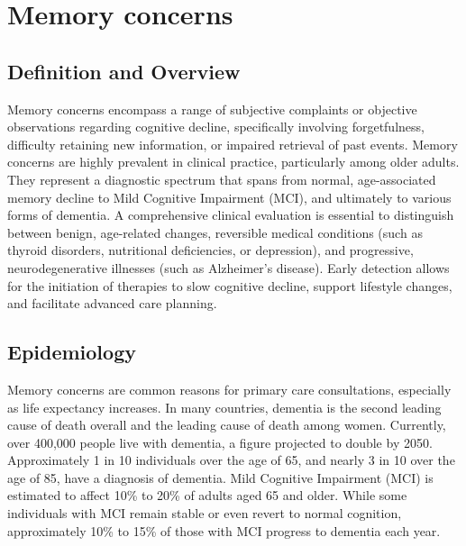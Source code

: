 \chapter{Memory concerns}

\section*{Definition and Overview}
Memory concerns encompass a range of subjective complaints or objective observations regarding cognitive decline, specifically involving forgetfulness, difficulty retaining new information, or impaired retrieval of past events. Memory concerns are highly prevalent in clinical practice, particularly among older adults. They represent a diagnostic spectrum that spans from normal, age-associated memory decline to Mild Cognitive Impairment (MCI), and ultimately to various forms of dementia. A comprehensive clinical evaluation is essential to distinguish between benign, age-related changes, reversible medical conditions (such as thyroid disorders, nutritional deficiencies, or depression), and progressive, neurodegenerative illnesses (such as Alzheimer's disease). Early detection allows for the initiation of therapies to slow cognitive decline, support lifestyle changes, and facilitate advanced care planning.

\section*{Epidemiology}
Memory concerns are common reasons for primary care consultations, especially as life expectancy increases. In many countries, dementia is the second leading cause of death overall and the leading cause of death among women. Currently, over 400,000 people live with dementia, a figure projected to double by 2050. Approximately 1 in 10 individuals over the age of 65, and nearly 3 in 10 over the age of 85, have a diagnosis of dementia. Mild Cognitive Impairment (MCI) is estimated to affect 10\% to 20\% of adults aged 65 and older. While some individuals with MCI remain stable or even revert to normal cognition, approximately 10\% to 15\% of those with MCI progress to dementia each year.

